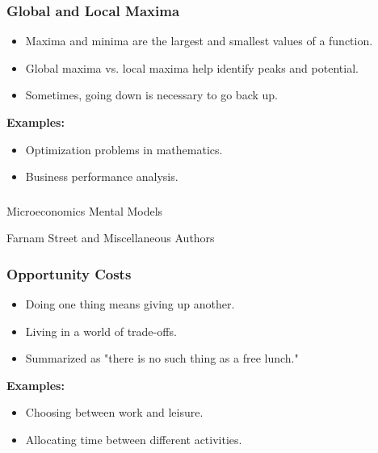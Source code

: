 \begin{frame}[fragile]\frametitle{Global and Local Maxima}
\begin{itemize}
    \item Maxima and minima are the largest and smallest values of a function.
    \item Global maxima vs. local maxima help identify peaks and potential.
    \item Sometimes, going down is necessary to go back up.
\end{itemize}
\textbf{Examples:}
\begin{itemize}
    \item Optimization problems in mathematics.
    \item Business performance analysis.
\end{itemize}
\end{frame}


\begin{frame}[fragile]\frametitle{}
\begin{center}
{\Large Microeconomics Mental Models}

{\tiny Farnam Street and Miscellaneous Authors }


\end{center}
\end{frame}

\begin{frame}[fragile]\frametitle{Opportunity Costs}
\begin{itemize}
    \item Doing one thing means giving up another.
    \item Living in a world of trade-offs.
    \item Summarized as "there is no such thing as a free lunch."
\end{itemize}
\textbf{Examples:}
\begin{itemize}
    \item Choosing between work and leisure.
    \item Allocating time between different activities.
\end{itemize}
\end{frame}

